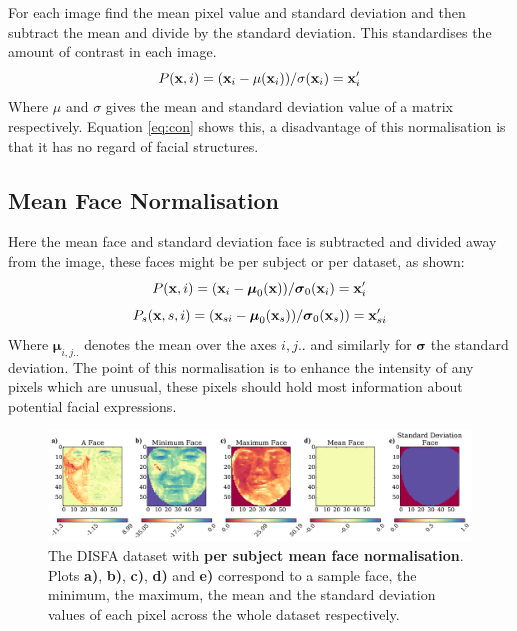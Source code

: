       For each image find the mean pixel value and standard deviation and then subtract the mean
      and divide by the standard deviation. This standardises the amount of contrast in each image.
      \begin{equation}
         P({\bf x},i)= ({\bf x}_{i} - \mu({\bf x}_{i}))/\sigma ({\bf x}_{i}) = {\bf x}_{i}'
         \label{eq:con}
      \end{equation}
      Where $\mu$ and $\sigma$ gives the mean and standard deviation value of a matrix respectively.
      Equation \ref{eq:con} shows this, a disadvantage of this normalisation is that it
      has no regard of facial structures.

    \subsection{Mean Face Normalisation} \label{sec:meanface}
      Here the mean face and standard deviation face is subtracted and divided away from the
      image, these faces might be per subject or per dataset, as shown:
      \begin{equation}
        P({\bf x},i) =  ({\bf x}_{i} - {\boldsymbol \mu}_0( {\bf x}))/{\boldsymbol \sigma}_0({\bf x}_{i})  = {\bf x}_{i}'
      \end{equation}
      \begin{equation}
        P_s({\bf x},s,i) = ({\bf x}_{si} - {\boldsymbol \mu}_{0}( {\bf x}_s))/{\boldsymbol \sigma}_{0}( {\bf x}_s))  = {\bf x}_{si}'
      \end{equation}
      Where ${\boldsymbol \mu}_{i,j..}$ denotes the mean over the axes $i,j..$ and
      similarly for ${\boldsymbol \sigma} $ the standard deviation.
      The point of this normalisation is to enhance the intensity of any pixels which
      are unusual, these pixels should hold most information about potential facial expressions.
      \begin{figure}[!h] \centering
      \includegraphics[width =\hsize]{figures/faces_per_subject_face.pdf}
      \caption{The DISFA dataset with {\bf per subject mean face normalisation}.
      Plots {\bf a)}, {\bf b)}, {\bf c)}, {\bf d)} and {\bf e)}
      correspond to a sample face, the minimum, the maximum,
      the mean and the standard deviation values of each pixel across
      the whole dataset respectively.}
      \label{fig:}
      \end{figure}

